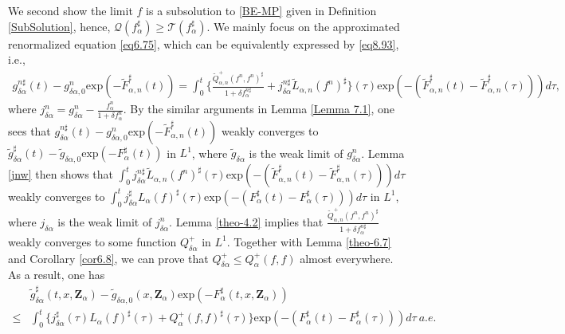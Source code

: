 \documentclass[reqno,11pt]{amsart}
\numberwithin{equation}{section}
\def\exp{\mathrm{exp}}
\begin{document}
We second show the limit $f$ is a subsolution to \eqref{BE-MP} given in Definition \ref{SubSolution}, hence, $ \mathcal{Q} (f_\alpha^\sharp) \geq \mathcal{T} (f_\alpha^\sharp) $. We mainly focus on the approximated renormalized equation \eqref{eq6.75}, which can be equivalently expressed by \eqref{eq8.93}, i.e.,
\begin{equation*}
  \begin{aligned}
    g^{n\sharp}_{\delta \alpha } (t) -g^n_{\delta \alpha,0}  \exp(-\tilde{F}^\sharp _{\alpha ,n } (t)) = \int_{0}^{t} \{\tfrac{\tilde{Q}^+_{\alpha ,n} (f^n,f^n)^\sharp }{1+\delta f^{n\sharp }_\alpha} +j^{n\sharp}_{\delta \alpha }\tilde{L}_{\alpha ,n}(f^n)^\sharp\} (\tau) \exp(-(\tilde{F}^\sharp _{\alpha ,n } (t)- \tilde{F}^\sharp _{\alpha ,n } (\tau))) d \tau ,
  \end{aligned}
\end{equation*}
where $j^{n}_{\delta \alpha } =g^{n}_{\delta \alpha } -\frac{f^n_\alpha}{1+\delta f^n_\alpha}$. By the similar arguments in Lemma \ref{Lemma 7.1}, one sees that $ g^{n\sharp}_{\delta \alpha } (t) -g^n_{\delta \alpha,0}  \exp(-\tilde{F}^\sharp _{\alpha, n } (t)) $ weakly converges to $\tilde{g}^{\sharp}_{\delta \alpha } (t) -\tilde{g}_{\delta \alpha,0}  \exp(- F^\sharp _{\alpha } (t))$ in $L^1$, where $\tilde{g}_{\delta \alpha }$ is the weak limit of $g^{n}_{\delta \alpha }$. Lemma \ref{jnw} then shows that $ \int_{0}^{t} j^{n\sharp}_{\delta \alpha }\tilde{L}_{\alpha ,n}(f^n)^\sharp (\tau) \exp(-(\tilde{F}^\sharp _{\alpha ,n } (t)- \tilde{F}^\sharp _{\alpha ,n } (\tau))) d \tau $ weakly converges to $ \int_{0}^{t} j^{\sharp}_{\delta \alpha } L_{\alpha}(f)^\sharp (\tau) \exp(-({F}^\sharp _{\alpha} (t)- {F}^\sharp _{\alpha} (\tau))) d \tau $ in $L^1$, where $ j_{\delta \alpha } $ is the weak limit of $j^{n}_{\delta \alpha }$. Lemma \ref{theo-4.2} implies that $ \tfrac{\tilde{Q}^+_{\alpha ,n} (f^n,f^n)^\sharp }{1+\delta f^{n\sharp }_\alpha} $ weakly converges to some function $ Q^+_{\delta \alpha} $ in $L^1$. Together with Lemma \ref{theo-6.7} and Corollary \ref{cor6.8}, we can prove that $ Q^+_{\delta \alpha} \leq Q^+_\alpha (f, f) $ almost everywhere. As a result, one has
\begin{equation*}
	\begin{aligned}
		&\tilde{g}^{\sharp}_{\delta \alpha } (t,x,\mathbf{Z}_\alpha) -\tilde{g}_{\delta \alpha,0} (x,\mathbf{Z}_\alpha) \exp(-F^\sharp _{\alpha} (t,x,\mathbf{Z}_\alpha)) \\
		\leq& \int_{0}^{t} \{j^{\sharp}_{\delta \alpha }(\tau) L_\alpha (f)^\sharp(\tau)+Q^+_{\alpha } (f,f) ^\sharp (\tau)\} \exp(-(F^\sharp _{\alpha } (t)- F^\sharp _{\alpha } (\tau))) d \tau \ a.e.
	\end{aligned}
\end{equation*}
\end{document}
